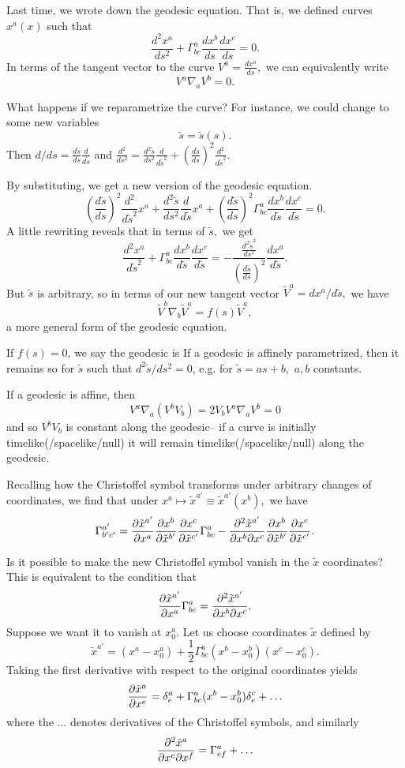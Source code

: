 Last time, we wrote down the geodesic equation. That is, we defined curves $x^a(x)$ such that
$$\frac{d^2x^a}{ds^2}+\Gamma^a_{bc}\frac{dx^b}{ds}\frac{dx^c}{ds}=0.$$
In terms of the tangent vector to the curve $V^a = \frac{dx^a}{ds},$
we can equivalently write
$$V^a\nabla_a V^b=0.$$

What happens if we reparametrize the curve? For instance, we could change to some new variables $$\tilde s=\tilde s(s).$$
Then $d/ds=\frac{d\tilde s}{ds} \frac{d}{d\tilde s}$ and $\frac{d^2}{ds^2}=\frac{d^2 \tilde s}{ds^2}\frac{d}{d\tilde s^2} + (\frac{d\tilde s}{ds})^2\frac{d^2}{d\tilde s^2}.$

By substituting, we get a new version of the geodesic equation.
$$\left(\frac{d\tilde s}{ds}\right)^2 \frac{d^2}{d\tilde s^2} x^a+ \frac{d^2\tilde s}{ds^2} \frac{d}{d\tilde s} x^a + \left(\frac{d\tilde s}{ds}\right)^2 \Gamma^a_{bc} \frac{dx^b}{d\tilde s}\frac{dx^c}{d\tilde s}=0.$$
A little rewriting reveals that in terms of $\tilde s,$ we get
$$\frac{d^2x^a}{d\tilde s^2}+\Gamma^a_{bc} \frac{dx^b}{d\tilde s} \frac{dx^c}{d\tilde s}=-\frac{\frac{d^2\tilde s^2}{d s^2}}{\left(\frac{d\tilde s}{d s}\right)^2} \frac{dx^a}{d\tilde s}.$$
But $\tilde s$ is arbitrary, so in terms of our new tangent vector $\tilde V^a=dx^a/d\tilde s,$ we have
$$\tilde V^b \nabla_b \tilde V^a=f(s)\tilde V^a,$$
a more general form of the geodesic equation. 
\begin{defn}
If $f(s)=0$, we say the geodesic is  If a geodesic is affinely parametrized, then it remains so for $\tilde s$ such that $d^2\tilde s/ds^2=0$, e.g. for $\tilde s= as+b,$ $a,b$ constants.
\end{defn}

If a geodesic is affine, then
$$V^a \nabla_a (V^b V_b)=2V_b V^a \nabla _a V^b=0$$ and so $V^b V_b$ is constant along the geodesic-- if a curve is initially timelike(/spacelike/null) it will remain timelike(/spacelike/null) along the geodesic.

Recalling how the Christoffel symbol transforms under arbitrary changes of coordinates, we find that under $x^a \mapsto \tilde x^{a'}\equiv \tilde x^{a'}(x^b),$ we have
$$\Gamma^{a'}_{b'c'}= \frac{\partial \tilde x^{a'}}{\partial x^a}\frac{\partial x^b}{\partial \tilde x^{b'}}\frac{\partial x^c}{\partial \tilde x^{c'}}\Gamma^a_{bc}-\frac{\partial^2 \tilde x^{a'}}{\partial  x^{b} \partial  x^{c}}\frac{\partial x^b}{\partial \tilde x^{b'}}\frac{\partial x^c}{\partial \tilde x^{c'}}.$$

Is it possible to make the new Christoffel symbol vanish in the $\tilde x$ coordinates? This is equivalent to the condition that
$$\frac{\partial \tilde x^{a'}}{\partial x^a} \Gamma^a_{bc}= \frac{\partial^2 \tilde x^{a'}}{\partial x^b \partial x^c}.$$ Suppose we want it to vanish at $x^a_0$. Let us choose coordinates $\tilde x$ defined by
$$\tilde x^{a'}=(x^a-x^a_0)+\frac{1}{2}\Gamma^a_{bc}(x^b-x_0^b)(x^c-x^c_0).$$
Taking the first derivative with respect to the original coordinates yields
$$\frac{\partial \tilde x^a}{\partial x^e}=\delta^a_e +\Gamma^a_{bc}(x^b-x^b_0)\delta^c_e+\ldots$$ where the $\ldots$ denotes derivatives of the Christoffel symbols, and similarly
$$\frac{\partial^2 \tilde x^a}{\partial x^e \partial x^f}=\Gamma^a_{ef}+\ldots$$

